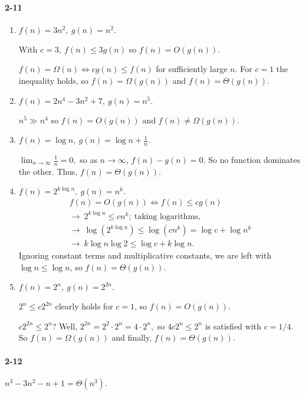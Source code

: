 \documentclass{report}
\begin{document}
\paragraph{2-11}
\begin{enumerate}[label=(\alph*)]
	\item $f(n) = 3n^2,\ g(n) = n^2.$

		With $c = 3,\ f(n) \le 3g(n)$ so $f(n) = O(g(n)).$

		$f(n) = \Omega(n) \Leftrightarrow cg(n) \le f(n)$ for sufficiently large $n$. For $c = 1$ the inequality holds, so $f(n) = \Omega(g(n))$ and $f(n) = \Theta(g(n)).$

	\item $f(n) = 2n^4 - 3n^2 + 7,\ g(n) = n^5.$

		$n^5 \gg n^4$ so $f(n) = O(g(n))$ and $f(n) \ne \Omega(g(n)).$

	\item $f(n) = \log n,\ g(n) = \log n + \frac{1}{n}.$

		$\lim_{n\rightarrow\infty} \frac{1}{n} = 0,$ so as $n\rightarrow\infty$, $f(n) - g(n) = 0$. So no function dominates the other. Thus, $f(n) = \Theta(g(n)).$

	\item $f(n) = 2^{k\log n},\ g(n) = n^k.$
		\begin{gather*}
			f(n) = O(g(n)) \Leftrightarrow f(n) \le cg(n) \\
			\rightarrow\ 2^{k\log n} \le cn^k;\ \text{taking logarithms,} \\
			\rightarrow\ \log\left(2^{k\log n}\right) \le \log\left(cn^k\right)
				= \log c + \log n^k \\
			\rightarrow\ k\log n\log 2 \le \log c + k\log n.
		\end{gather*}
		Ignoring constant terms and multiplicative constants, we are left with
		$\log n \le \log n$, so $f(n) = \Theta(g(n)).$

	\item $f(n) = 2^n,\ g(n) = 2^{2n}.$

		$2^n \le c2^{2n}$ clearly holds for $c = 1$, so $f(n) = O(g(n)).$

		$c2^{2n} \le 2^n$? Well, $2^{2n} = 2^2\cdot2^n = 4\cdot2^n,$ so $4c2^n \le 2^n$ is satisfied with $c = 1/4.$ So $f(n) = \Omega(g(n))$ and finally, $f(n) = \Theta(g(n)).$
\end{enumerate}

\paragraph{2-12}$n^3 - 3n^2 -n + 1 = \Theta(n^3).$
\end{document}
